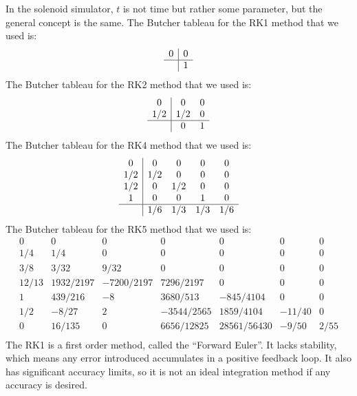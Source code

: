 \documentclass[12pt]{article}
\begin{document}
	In the solenoid simulator, $t$ is not time but rather some parameter, but the general concept is the same. The Butcher tableau for the RK1 method that we used is:
			\[\begin{array}{c|c}
				0 & 0 \\
				\hline
  				  & 1 \\
			\end{array}\]			
	The Butcher tableau for the RK2 method that we used is:	
			\[\begin{array}{c|cc}
				0   & 0   & 0  \\
				1/2 & 1/2 & 0  \\
				\hline
    				& 0   & 1  \\
			\end{array}\]			
	The Butcher tableau for the RK4 method that we used is:
			\[\begin{array}{c|cccc}
				0   & 0   & 0   & 0   & 0\\
				1/2 & 1/2 & 0   & 0   & 0\\
				1/2 & 0   & 1/2 & 0   & 0\\
				1   & 0   & 0   & 1   & 0\\
				\hline
    				& 1/6 & 1/3 & 1/3 & 1/6\\
			\end{array}\]
	The Butcher tableau for the RK5 method that we used is:
			\[\begin{array}{c|cccccc}
				0     & 0         & 0          & 0           & 0          & 0        & 0\\
				1/4   & 1/4       & 0          & 0           & 0          & 0        & 0\\
				3/8   & 3/32      & 9/32       & 0           & 0          & 0        & 0\\
				12/13 & 1932/2197 & -7200/2197 & 7296/2197   & 0          & 0        & 0\\
				1     & 439/216   & -8         & 3680/513    & -845/4104  & 0        & 0\\
				1/2   & -8/27     & 2          & -3544/2565  & 1859/4104  & -11/40   & 0\\
				\hline
    		    0     & 16/135    & 0          & 6656/12825  & 28561/56430&-9/50     & 2/55\\
			\end{array}\]
	The RK1 is a first order method, called the ``Forward Euler''. It lacks stability, which means any error introduced accumulates in a positive feedback loop. It also has significant accuracy limits, so it is not an ideal integration method if any accuracy is desired.
	
\end{document}
